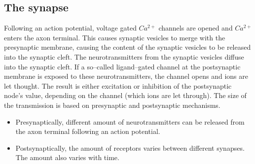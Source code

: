 \subsection{The synapse}
\label{ssecTheSynapse}
Following an action potential, voltage gated $Ca^{2+}$ channels are opened and $Ca^{2+}$ enters the axon terminal.
This causes synaptic vesicles to merge with the presynaptic membrane, causing the content of the synaptic vesicles to be released into the synaptic cleft. %
The neurotransmitters from the synaptic vesicles diffuse into the synaptic cleft.
If a so--called ligand--gated channel at the postsynaptic membrane is exposed to these neurotransmitters, the channel opens and ions are let thought.
The result is either excitation or inhibition of the postsynaptic node's value, depending on the channel (which ions are let through).
The size of the transmission is based on presynaptic and postsynaptic mechanisms\cite{PurvesNeuroscienceKAP05}.

\begin{itemize}
	\item Presynaptically, different amount of neurotransmitters can be released from the axon terminal following an action potential.
	\item Postsynaptically, the amount of receptors varies between different synapses. The amount also varies with time. %
\end{itemize}

